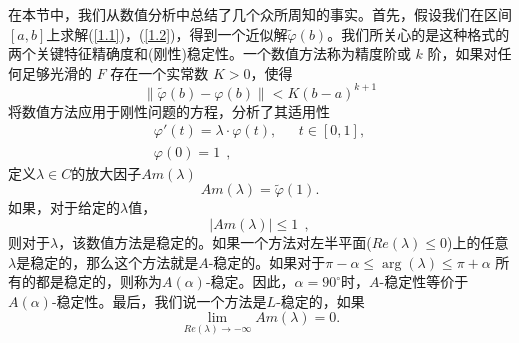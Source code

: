 \documentclass[12pt,a4paper]{article}
\begin{document}
在本节中，我们从数值分析中总结了几个众所周知的事实。首先，假设我们在区间$[a,b]$上求解(\ref{1.1})，(\ref{1.2})，得到一个近似解$\tilde{\varphi} (b)$。我们所关心的是这种格式的两个关键特征精确度和(刚性)稳定性。一个数值方法称为精度阶或 $k$ 阶，如果对任何足够光滑的 $F$ 存在一个实常数 $K>0$，使得\\
\begin{equation}
\label{2.1}
\parallel \tilde{\varphi} (b) - \varphi(b) \parallel < K (b-a)^{k+1}
\end{equation}
将数值方法应用于刚性问题的方程，分析了其适用性\\
\begin{equation}
\begin{split}
\varphi ' (t)= \lambda \cdot \varphi(t),~~~~~~~t \in [0,1], \\
\varphi (0)=1~~,
\label{2.2}
\end{split}
\end{equation}
定义$\lambda \in C$的放大因子$Am(\lambda)$\\
\begin{equation}
\label{2.3}
Am(\lambda)= \tilde{ \varphi }(1).
\end{equation}
如果，对于给定的$\lambda$值，\\
\begin{equation}
|Am(\lambda)| \leq 1 ~~,
\end{equation}
则对于$\lambda$，该数值方法是稳定的。如果一个方法对左半平面($Re(\lambda) \leq 0$)上的任意$\lambda$是稳定的，那么这个方法就是$A$-稳定的。如果对于$\pi - \alpha \leq \arg (\lambda) \leq \pi + \alpha$ 所有的都是稳定的，则称为$A(\alpha)$-稳定。因此，$\alpha=90^\circ$时，$A$-稳定性等价于$A(\alpha)$-稳定性。最后，我们说一个方法是$L$-稳定的，如果\\
\begin{equation}
\lim_{Re(\lambda) \to -\infty} Am(\lambda)= 0.
\end{equation}
\end{document}
